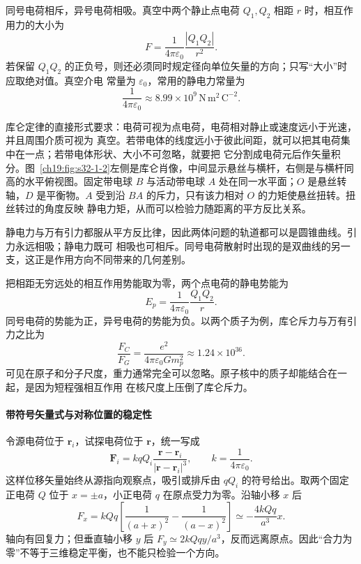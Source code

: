同号电荷相斥，异号电荷相吸。真空中两个静止点电荷 $Q_1,Q_2$ 相距 $r$ 时，相互作用力的大小为
\begin{equation}
  \boxed{F=\frac{1}{4\pi\varepsilon_0}\frac{|Q_1Q_2|}{r^2}}.
\end{equation}
若保留 $Q_1Q_2$ 的正负号，则还必须同时规定径向单位矢量的方向；只写“大小”时应取绝对值。真空介电
常量为 $\varepsilon_0$，常用的静电力常量为
\begin{equation}
  \boxed{\frac{1}{4\pi\varepsilon_0}
  \approx8.99\times10^9
  \,\mathrm{N\,m^2\,C^{-2}}}.
\end{equation}

库仑定律的直接形式要求：电荷可视为点电荷，电荷相对静止或速度远小于光速，并且周围介质可视为
真空。若带电体的线度远小于彼此间距，就可以把其电荷集中在一点；若带电体形状、大小不可忽略，就要把
它分割成电荷元后作矢量积分。图~\ref{ch19:fig:s32-1-2}左侧是库仑肖像，中间显示悬丝与横杆，右侧是与横杆同高的水平俯视图。固定带电球 $B$ 与活动带电球 $A$ 处在同一水平面；$O$ 是悬丝转轴，$D$ 是平衡物。$A$ 受到沿 $BA$ 的斥力，只有该力相对 $O$ 的力矩使悬丝扭转。扭丝转过的角度反映
静电力矩，从而可以检验力随距离的平方反比关系。

\par\noindent\begin{minipage}{\linewidth}
\coulombHistoryFigure
{}\label{ch19:fig:s32-1-2}
\end{minipage}\par\medskip

静电力与万有引力都服从平方反比律，因此两体问题的轨道都可以是圆锥曲线。引力永远相吸；静电力既可
相吸也可相斥。同号电荷散射时出现的是双曲线的另一支，这正是作用方向不同带来的几何差别。

把相距无穷远处的相互作用势能取为零，两个点电荷的静电势能为
\begin{equation}
  \boxed{E_p=\frac{1}{4\pi\varepsilon_0}\frac{Q_1Q_2}{r}}.
\end{equation}
同号电荷的势能为正，异号电荷的势能为负。以两个质子为例，库仑斥力与万有引力之比为
\begin{equation}
  \frac{F_C}{F_G}
  =\frac{e^2}{4\pi\varepsilon_0Gm_p^2}
  \approx1.24\times10^{36}.
\end{equation}
可见在原子和分子尺度，重力通常完全可以忽略。原子核中的质子却能结合在一起，是因为短程强相互作用
在核尺度上压倒了库仑斥力。


\paragraph{带符号矢量式与对称位置的稳定性}
令源电荷位于 $\boldsymbol r_i$，试探电荷位于 $\boldsymbol r$，统一写成
\[
 \boldsymbol F_i=kqQ_i\frac{\boldsymbol r-\boldsymbol r_i}{|\boldsymbol r-\boldsymbol r_i|^3},
 \qquad k=\frac1{4\pi\varepsilon_0}.
\]
这样位移矢量始终从源指向观察点，吸引或排斥由 $qQ_i$ 的符号给出。取两个固定正电荷 $Q$ 位于 $x=\pm a$，小正电荷 $q$ 在原点受力为零。沿轴小移 $x$ 后
\[
 F_x=kQq\left[\frac1{(a+x)^2}-\frac1{(a-x)^2}\right]
 \simeq-\frac{4kQq}{a^3}x.
\]
轴向有回复力；但垂直轴小移 $y$ 后 $F_y\simeq2kQq y/a^3$，反而远离原点。因此“合力为零”不等于三维稳定平衡，也不能只检验一个方向。



